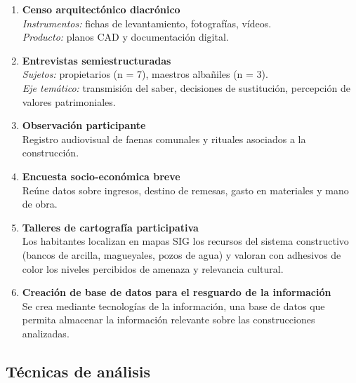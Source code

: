 \vspace{-0.5em}
\begin{enumerate}
	\item \textbf{Censo arquitectónico diacrónico}\\
	      \textit{Instrumentos:} fichas de levantamiento, fotografías, vídeos.\\
	      \textit{Producto:} planos CAD y documentación digital.
	\item \textbf{Entrevistas semiestructuradas}\\
	      \textit{Sujetos:} propietarios (n = 7), maestros albañiles (n = 3). \\
	      \textit{Eje temático:} transmisión del saber, decisiones de
	      sustitución, percepción de valores patrimoniales.
	\item \textbf{Observación participante}\\
	      Registro audiovisual de faenas comunales y rituales asociados a la construcción.
	\item \textbf{Encuesta socio-económica breve}\\
	      Reúne datos sobre ingresos, destino de remesas, gasto en materiales y mano de obra.
	\item \textbf{Talleres de cartografía participativa}\\
	      Los habitantes localizan en mapas SIG los recursos del
	      sistema constructivo (bancos de arcilla, magueyales, pozos de
	      agua) y valoran con adhesivos de color los niveles percibidos de
	      amenaza y relevancia cultural.
	\item \textbf{Creación de base de datos para el resguardo de la información}\\
	      Se crea mediante tecnologías de la información, una base de datos que permita
	      almacenar la información relevante sobre las construcciones analizadas.
\end{enumerate}

\subsection{Técnicas de análisis}


